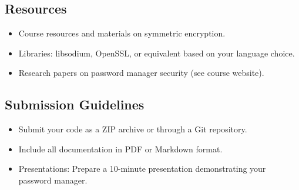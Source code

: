 \documentclass[10pt,a4paper,american]{exam}
\begin{document}
\subsection*{Resources}
\begin{itemize}
	\item Course resources and materials on symmetric encryption.
	\item Libraries: libsodium, OpenSSL, or equivalent based on your language choice.
	\item Research papers on password manager security (see course website).
\end{itemize}

\subsection*{Submission Guidelines}
\begin{itemize}
	\item Submit your code as a ZIP archive or through a Git repository.
	\item Include all documentation in PDF or Markdown format.
	\item Presentations: Prepare a 10-minute presentation demonstrating your password manager.
\end{itemize}
\end{document}
